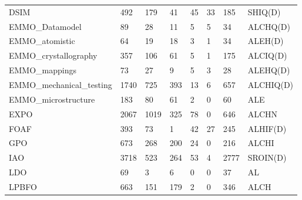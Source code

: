\begin{table}
\begin{tabular}{m{3.5cm}m{1cm}m{1cm}m{1cm}m{1cm}m{1cm}m{1cm}m{1cm}}
DSIM                        &       492 &               179 &         41 &                   45 &                     33 &                      185 &          SHIQ(D) \\
EMMO\_Datamodel              &        89 &                28 &         11 &                    5 &                      5 &                       34 &         ALCHQ(D) \\
EMMO\_atomistic              &        64 &                19 &         18 &                    3 &                      1 &                       34 &          ALEH(D) \\
EMMO\_crystallography        &       357 &               106 &         61 &                    5 &                      1 &                      175 &         ALCIQ(D) \\
EMMO\_mappings               &        73 &                27 &          9 &                    5 &                      3 &                       28 &         ALEHQ(D) \\
EMMO\_mechanical\_testing     &      1740 &               725 &        393 &                   13 &                      6 &                      657 &        ALCHIQ(D) \\
EMMO\_microstructure         &       183 &                80 &         61 &                    2 &                      0 &                       60 &              ALE \\
EXPO                        &      2067 &              1019 &        325 &                   78 &                      0 &                      646 &            ALCHN \\
FOAF                        &       393 &                73 &          1 &                   42 &                     27 &                      245 &         ALHIF(D) \\
GPO                         &       673 &               268 &        200 &                   24 &                      0 &                      216 &            ALCHI \\
IAO                         &      3718 &               523 &        264 &                   53 &                      4 &                     2777 &         SROIN(D) \\
LDO                         &        69 &                 3 &          6 &                    0 &                      0 &                       37 &               AL \\
LPBFO                       &       663 &               151 &        179 &                    2 &                      0 &                      346 &             ALCH \\

\end{tabular}
\end{table}
